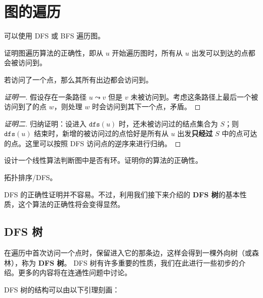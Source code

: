 \section{图的遍历}

可以使用 DFS 或 BFS 遍历图。

\begin{exercise}
    证明图遍历算法的正确性，即从 $u$ 开始遍历图时，所有从 $u$ 出发可以到达的点都会被访问到。
    \begin{hint}
        若访问了一个点，那么其所有出边都会访问到。
    \end{hint}
\end{exercise}
\begin{proof}[证明一]
    假设存在一条路径 $u\leadsto v$ 但是 $v$ 未被访问到。考虑这条路径上最后一个被访问到了的点 $w$，则处理 $w$ 时会访问到其下一个点，矛盾。 
\end{proof}
\begin{proof}[证明二]
    归纳证明：设进入 $\mathtt{dfs}(u)$ 时，还未被访问过的结点集合为 $S$；则 $\mathtt{dfs}(u)$ 结束时，新增的被访问过的点恰好是所有从 $u$ 出发\textbf{只经过} $S$ 中的点可达的点。这里可以按照 DFS 访问点的逆序来进行归纳。
\end{proof}

\begin{exercise}
    设计一个线性算法判断图中是否有环。证明你的算法的正确性。
\end{exercise}
\begin{solution}
    拓扑排序/DFS。
\end{solution}
\begin{remark}
    DFS 的正确性证明并不容易。不过，利用我们接下来介绍的 \textbf{DFS 树}的基本性质，这个算法的正确性将会变得显然。
\end{remark}


\subsection{DFS 树}

在遍历中首次访问一个点时，保留进入它的那条边，这样会得到一棵外向树（或森林），称为 \textbf{DFS 树}。
DFS 树有许多重要的性质，我们在此进行一些初步的介绍。更多的内容将在连通性问题中讨论。

DFS 树的结构可以由以下引理刻画：


